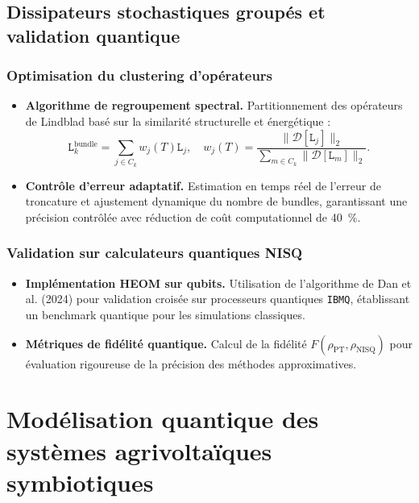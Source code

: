 \documentclass[12pt, a4paper]{article}
\begin{document}
\subsection{Dissipateurs stochastiques groupés et validation quantique}

\subsubsection{Optimisation du clustering d'opérateurs}

\begin{itemize}
    \item \textbf{Algorithme de regroupement spectral.} Partitionnement des opérateurs de Lindblad basé sur la similarité structurelle et énergétique :
    \begin{equation}
    \mathtt{L}_k^{\text{bundle}} = \sum_{j \in C_k} w_j(T) \mathtt{L}_j, \quad w_j(T) = \frac{\|\mathcal{D}[\mathtt{L}_j]\|_2}{\sum_{m\in C_k} \|\mathcal{D}[\mathtt{L}_m]\|_2}.
    \end{equation}
    
    \item \textbf{Contrôle d'erreur adaptatif.} Estimation en temps réel de l'erreur de troncature et ajustement dynamique du nombre de bundles, garantissant une précision contrôlée avec réduction de coût computationnel de \SI{40}{\percent}.
\end{itemize}

\subsubsection{Validation sur calculateurs quantiques NISQ}

\begin{itemize}
    \item \textbf{Implémentation HEOM sur qubits.} Utilisation de l'algorithme de Dan et al. (2024) pour validation croisée sur processeurs quantiques \texttt{IBMQ}, établissant un benchmark quantique pour les simulations classiques.
    
    \item \textbf{Métriques de fidélité quantique.} Calcul de la fidélité $F(\rho_{\text{PT}}, \rho_{\text{NISQ}})$ pour évaluation rigoureuse de la précision des méthodes approximatives.
\end{itemize}

\section{Modélisation quantique des systèmes agrivoltaïques symbiotiques}
\end{document}
